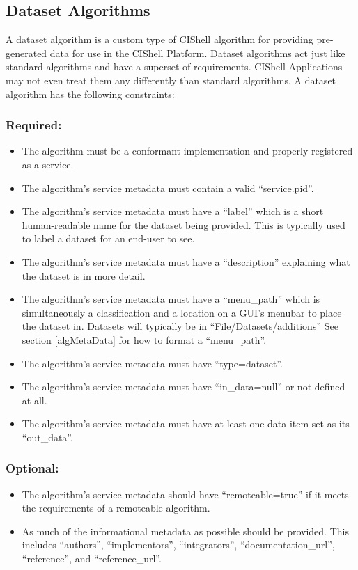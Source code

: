 \subsection{Dataset Algorithms}

A dataset algorithm is a custom type of CIShell algorithm for providing
pre-generated data for use in the CIShell Platform. Dataset algorithms act just
like standard algorithms and have a superset of requirements. CIShell
Applications may not even treat them any differently than standard algorithms. A
dataset algorithm has the following constraints:

\subsubsection*{Required:}
\begin{itemize}
  \item The algorithm must be a conformant 
  implementation and properly registered as a service.
  \item The algorithm's service metadata must contain a valid ``service.pid''.
  \item The algorithm's service metadata must have a ``label'' which is a
  short human-readable name for the dataset being provided. This is typically
  used to label a dataset for an end-user to see.
  \item The algorithm's service metadata must have a ``description''
  explaining what the dataset is in more detail.
  \item The algorithm's service metadata must have a ``menu\_path'' which is
  simultaneously a classification and a location on a GUI's menubar to place
  the dataset in. Datasets will typically be in ``File/Datasets/additions''
  See section \ref{algMetaData} for how to format a ``menu\_path''.
  \item The algorithm's service metadata must have ``type=dataset''.
  \item The algorithm's service metadata must have ``in\_data=null'' or
  not defined at all.
  \item The algorithm's service metadata must have at least one data item set
  as its ``out\_data''.
\end{itemize}

\subsubsection*{Optional:}
\begin{itemize}
  \item The algorithm's service metadata should have ``remoteable=true'' if it
  meets the requirements of a remoteable algorithm.
  \item As much of the informational metadata as possible should be
  provided. This includes ``authors'', ``implementors'', ``integrators'',
  ``documentation\_url'', ``reference'', and ``reference\_url''.
\end{itemize}

